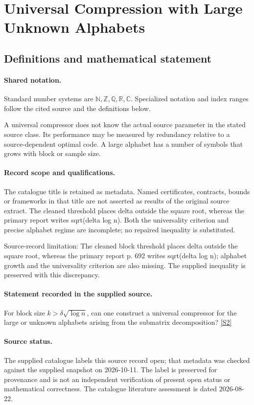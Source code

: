 \documentclass[11pt]{article}
\newcommand{\sref}[2]{\hyperlink{source:#1:#2}{[S#2]}}
\begin{document}
\section{Universal Compression with Large Unknown Alphabets}\label{statement}

\subsection{Definitions and mathematical statement}

\paragraph{Shared notation.}Standard number systems are $\mathbb N,\mathbb Z,\mathbb Q,\mathbb R,\mathbb C$. Specialized notation and index ranges follow the cited source and the definitions below.


A universal compressor does not know the actual source parameter in the stated source class. Its performance may be measured by redundancy relative to a source-dependent optimal code. A large alphabet has a number of symbols that grows with block or sample size.
\paragraph{Record scope and qualifications.}
The catalogue title is retained as metadata. Named certificates, contracts, bounds or frameworks in that title are not asserted as results of the original source extract.
The cleaned threshold places delta outside the square root, whereas the primary report writes sqrt(delta log n). Both the universality criterion and precise alphabet regime are incomplete; no repaired inequality is substituted.

Source-record limitation: The cleaned block threshold places delta outside the square root, whereas the primary report p. 692 writes sqrt(delta log n); alphabet growth and the universality criterion are also missing. The supplied inequality is preserved with this discrepancy.
\paragraph{Statement recorded in the supplied source.}
For block size $k>\delta\sqrt{\log n}$, can one construct a universal compressor for the large or unknown alphabets arising from the submatrix decomposition? \sref{statement}{2}
\paragraph{Source status.}
The supplied catalogue labels this source record open; that metadata was checked against the supplied snapshot on 2026-10-11. The label is preserved for provenance and is not an independent verification of present open status or mathematical correctness. The catalogue literature assessment is dated 2026-08-22.
\end{document}
